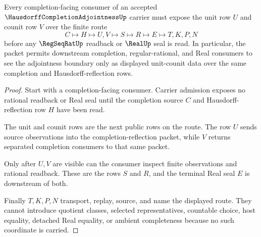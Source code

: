 \begin{theorem}
\label{thm:hausdorff-completion-adjointness-unit-counit-route}
Every completion-facing consumer of an accepted $\HausdorffCompletionAdjointnessUp$ carrier must expose the unit row $U$ and counit row $V$ over the finite route
$$
C \longmapsto H \longmapsto U,V \longmapsto S \longmapsto R \longmapsto E \longmapsto T,K,P,N
$$
before any $\RegSeqRatUp$ readback or $\RealUp$ seal is read. In particular, the packet permits downstream completion, regular-rational, and Real consumers to see the adjointness boundary only as displayed unit-counit data over the same completion and Hausdorff-reflection rows.
\end{theorem}
\begin{proof}
Start with a completion-facing consumer. Carrier admission exposes no rational readback or Real seal until the completion source $C$ and Hausdorff-reflection row $H$ have been read.

The unit and counit rows are the next public rows on the route. The row $U$ sends source observations into the completion-reflection packet, while $V$ returns separated completion consumers to that same packet.

Only after $U,V$ are visible can the consumer inspect finite observations and rational readback. These are the rows $S$ and $R$, and the terminal Real seal $E$ is downstream of both.

Finally $T,K,P,N$ transport, replay, source, and name the displayed route. They cannot introduce quotient classes, selected representatives, countable choice, host equality, detached Real equality, or ambient completeness because no such coordinate is carried.
\end{proof}



